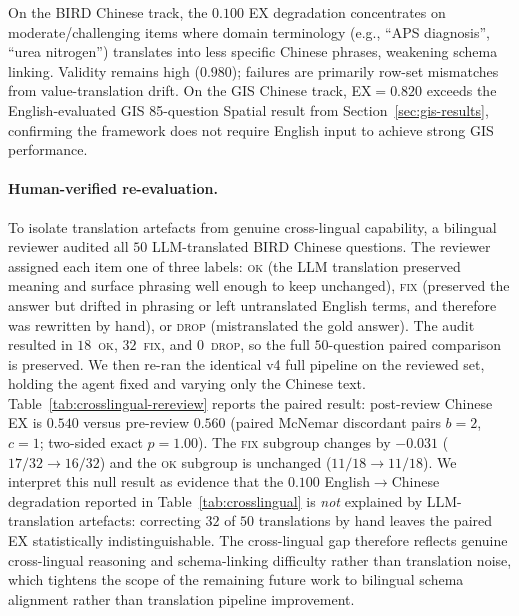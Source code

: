 \documentclass[11pt]{article}
\begin{document}
On the BIRD Chinese track, the $0.100$ EX degradation concentrates on moderate/challenging items where domain terminology (e.g., ``APS diagnosis'', ``urea nitrogen'') translates into less specific Chinese phrases, weakening schema linking. Validity remains high ($0.980$); failures are primarily row-set mismatches from value-translation drift. On the GIS Chinese track, EX$=0.820$ exceeds the English-evaluated GIS 85-question Spatial result from Section~\ref{sec:gis-results}, confirming the framework does not require English input to achieve strong GIS performance.

\paragraph{Human-verified re-evaluation.} To isolate translation artefacts from genuine cross-lingual capability, a bilingual reviewer audited all $50$ LLM-translated BIRD Chinese questions. The reviewer assigned each item one of three labels: \textsc{ok} (the LLM translation preserved meaning and surface phrasing well enough to keep unchanged), \textsc{fix} (preserved the answer but drifted in phrasing or left untranslated English terms, and therefore was rewritten by hand), or \textsc{drop} (mistranslated the gold answer). The audit resulted in $18$~\textsc{ok}, $32$~\textsc{fix}, and $0$~\textsc{drop}, so the full $50$-question paired comparison is preserved. We then re-ran the identical v4 full pipeline on the reviewed set, holding the agent fixed and varying only the Chinese text. Table~\ref{tab:crosslingual-rereview} reports the paired result: post-review Chinese EX is $0.540$ versus pre-review $0.560$ (paired McNemar discordant pairs $b=2$, $c=1$; two-sided exact $p=1.00$). The \textsc{fix} subgroup changes by $-0.031$ ($17/32 \to 16/32$) and the \textsc{ok} subgroup is unchanged ($11/18 \to 11/18$). We interpret this null result as evidence that the $0.100$ English$\to$Chinese degradation reported in Table~\ref{tab:crosslingual} is \emph{not} explained by LLM-translation artefacts: correcting $32$ of $50$ translations by hand leaves the paired EX statistically indistinguishable. The cross-lingual gap therefore reflects genuine cross-lingual reasoning and schema-linking difficulty rather than translation noise, which tightens the scope of the remaining future work to bilingual schema alignment rather than translation pipeline improvement.
\end{document}
